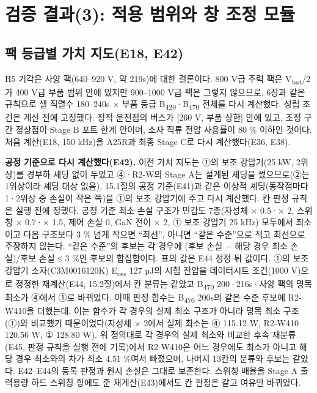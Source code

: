 \chapter{검증 결과(3): 적용 범위와 창 조정 모듈}

\section{팩 등급별 가치 지도(E18, E42)}

H5 기각은 사양 팩(640–920 V, 약 219s)에 대한 결론이다. 800 V급 주력 팩은 V\textsubscript{bat}/2가 400 V급 부품 범위 안에 있지만 900–1000 V급 팩은 그렇지 않으므로, 6장과 같은 규칙으로 셀 직렬수 180–240s × 부품 등급 B\textsubscript{420}·B\textsubscript{470} 전체를 다시 계산했다. 성립 조건은 계산 전에 고정했다. 정적 운전점의 버스가 [260 V, 부품 상한] 안에 있고, 조정 구간 정상점이 Stage B 포트 한계 안이며, 소자 직류 전압 사용률이 80 \% 이하인 것이다. 처음 계산(E18, 150 kHz)을 A25R과 최종 Stage C로 다시 계산했다(E36, E38).

\textbf{공정 기준으로 다시 계산했다(E42).} 이전 가치 지도는 ①의 보조 강압기(25 kW, 2위상)를 경부하 셰딩 없이 두었고 ④·R2-W의 Stage A는 설계된 셰딩을 썼으므로(②는 1위상이라 셰딩 대상 없음), 15.1절의 공정 기준(E41)과 같은 이상적 셰딩(동작점마다 1·2위상 중 손실이 작은 쪽)을 ①의 보조 강압기에 주고 다시 계산했다. 칸 판정 규칙은 실행 전에 정했다. 공정 기준 최소 손실 구조가 민감도 7종(자성체 × 0.5·× 2, 스위칭 × 0.7·× 1.5, 제어 손실 0, GaN 전이 × 2, ① 보조 강압기 25 kHz) 모두에서 최소이고 다음 구조보다 3 \% 넘게 작으면 “최선”, 아니면 “같은 수준”으로 적고 최선으로 주장하지 않는다. “같은 수준”의 후보는 각 경우에 (후보 손실 − 해당 경우 최소 손실)/후보 손실 ≤ 3 \%인 후보의 합집합이다. 표의 값은 E44 정정 뒤 값이다. ①의 보조 강압기 소자(C3M0016120K) E\textsubscript{oss} 127 µJ의 시험 전압을 데이터시트 조건(1000 V)으로 정정한 재계산(E44, 15.2절)에서 칸 분류는 같았고 B\textsubscript{470} 200·216s·사양 팩의 명목 최소가 ④에서 ①로 바뀌었다. 이때 판정 함수는 B\textsubscript{470} 200s의 같은 수준 후보에 R2-W410을 더했는데, 이는 함수가 각 경우의 실제 최소 구조가 아니라 명목 최소 구조(①)와 비교했기 때문이었다(자성체 × 2에서 실제 최소는 ④ 115.12 W, R2-W410 120.56 W, ① 128.80 W). 위 정의대로 각 경우의 실제 최소와 비교한 후속 재분류(E45, 판정 규칙을 실행 전에 기록)에서 R2-W410은 어느 경우에도 최소가 아니고 해당 경우 최소와의 차가 최소 4.51 \%여서 빠졌으며, 나머지 13칸의 분류와 후보는 같았다. E42–E44의 등록 판정과 원시 손실은 그대로 보존한다. 스위칭 배율을 Stage A 출력용량 하드 스위칭 항에도 준 재계산(E43)에서도 칸 판정은 같고 여유만 바뀌었다.

